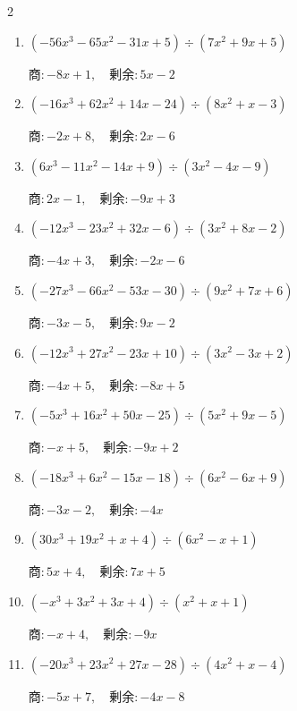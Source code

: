 \begin{multicols}{2}
\begin{enumerate}
        $商 : -6x+8, \quad 剰余 : 7x+1$

  \item $(-56x^{3}-65x^{2}-31x+5) \div (7x^{2}+9x+5)$

        $商 : -8x+1, \quad 剰余 : 5x-2$

  \item $(-16x^{3}+62x^{2}+14x-24) \div (8x^{2}+x-3)$

        $商 : -2x+8, \quad 剰余 : 2x-6$

  \item $(6x^{3}-11x^{2}-14x+9) \div (3x^{2}-4x-9)$

        $商 : 2x-1, \quad 剰余 : -9x+3$

\columnbreak %

  \item $(-12x^{3}-23x^{2}+32x-6) \div (3x^{2}+8x-2)$

        $商 : -4x+3, \quad 剰余 : -2x-6$

  \item $(-27x^{3}-66x^{2}-53x-30) \div (9x^{2}+7x+6)$

        $商 : -3x-5, \quad 剰余 : 9x-2$

  \item $(-12x^{3}+27x^{2}-23x+10) \div (3x^{2}-3x+2)$

        $商 : -4x+5, \quad 剰余 : -8x+5$

  \item $(-5x^{3}+16x^{2}+50x-25) \div (5x^{2}+9x-5)$

        $商 : -x+5, \quad 剰余 : -9x+2$

  \item $(-18x^{3}+6x^{2}-15x-18) \div (6x^{2}-6x+9)$

        $商 : -3x-2, \quad 剰余 : -4x$

\columnbreak %

\resetques

  \item $(30x^{3}+19x^{2}+x+4) \div (6x^{2}-x+1)$

        $商 : 5x+4, \quad 剰余 : 7x+5$

  \item $(-x^{3}+3x^{2}+3x+4) \div (x^{2}+x+1)$

        $商 : -x+4, \quad 剰余 : -9x$

  \item $(-20x^{3}+23x^{2}+27x-28) \div (4x^{2}+x-4)$

        $商 : -5x+7, \quad 剰余 : -4x-8$


\end{enumerate}
\end{multicols}
